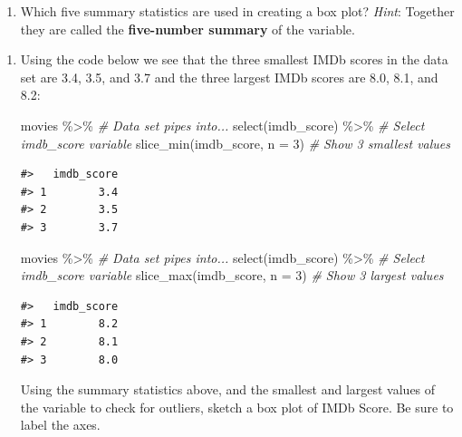 \documentclass[
]{report}
\newenvironment{Shaded}{\begin{snugshade}}{\end{snugshade}}
\newcommand{\AttributeTok}[1]{\textcolor[rgb]{0.77,0.63,0.00}{#1}}
\newcommand{\CommentTok}[1]{\textcolor[rgb]{0.56,0.35,0.01}{\textit{#1}}}
\newcommand{\DecValTok}[1]{\textcolor[rgb]{0.00,0.00,0.81}{#1}}
\newcommand{\FunctionTok}[1]{\textcolor[rgb]{0.00,0.00,0.00}{#1}}
\newcommand{\NormalTok}[1]{#1}
\newcommand{\SpecialCharTok}[1]{\textcolor[rgb]{0.00,0.00,0.00}{#1}}
\providecommand{\tightlist}{%
  \setlength{\itemsep}{0pt}\setlength{\parskip}{0pt}}
\begin{document}
\begin{enumerate}
\def\labelenumi{\arabic{enumi}.}
\setcounter{enumi}{10}
\tightlist
\item
  Which five summary statistics are used in creating a box plot? \emph{Hint}: Together they are called the \textbf{five-number summary} of the variable.
\end{enumerate}

\vspace{0.4in}

\begin{enumerate}
\def\labelenumi{\arabic{enumi}.}
\setcounter{enumi}{11}
\item
  Using the code below we see that the three smallest IMDb scores in the data set are 3.4, 3.5, and 3.7 and the three largest IMDb scores are 8.0, 8.1, and 8.2:

\begin{Shaded}
\begin{Highlighting}[]
\NormalTok{movies }\SpecialCharTok{\%\textgreater{}\%} \CommentTok{\# Data set pipes into...}
  \FunctionTok{select}\NormalTok{(imdb\_score) }\SpecialCharTok{\%\textgreater{}\%} \CommentTok{\# Select imdb\_score variable}
  \FunctionTok{slice\_min}\NormalTok{(imdb\_score, }\AttributeTok{n =} \DecValTok{3}\NormalTok{)  }\CommentTok{\# Show 3 smallest values}
\end{Highlighting}
\end{Shaded}

\begin{verbatim}
#>   imdb_score
#> 1        3.4
#> 2        3.5
#> 3        3.7
\end{verbatim}

\begin{Shaded}
\begin{Highlighting}[]
\NormalTok{movies }\SpecialCharTok{\%\textgreater{}\%} \CommentTok{\# Data set pipes into...}
  \FunctionTok{select}\NormalTok{(imdb\_score) }\SpecialCharTok{\%\textgreater{}\%} \CommentTok{\# Select imdb\_score variable}
  \FunctionTok{slice\_max}\NormalTok{(imdb\_score, }\AttributeTok{n =} \DecValTok{3}\NormalTok{)  }\CommentTok{\# Show 3 largest values}
\end{Highlighting}
\end{Shaded}

\begin{verbatim}
#>   imdb_score
#> 1        8.2
#> 2        8.1
#> 3        8.0
\end{verbatim}

  Using the summary statistics above, and the smallest and largest values of the variable to check for outliers, sketch a box plot of IMDb Score. Be sure to label the axes.
\end{enumerate}
\end{document}
